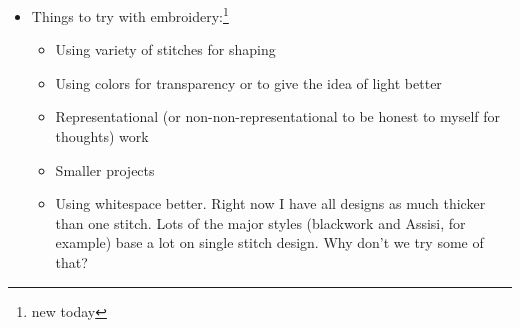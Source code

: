 \documentclass[12pt]{article}
\renewcommand{\,}{\textsuperscript{,}}
\begin{document}
\begin{itemize}
\begin{itemize}
\begin{itemize}
\begin{itemize}
Since every stitch is going to be marked out\footnote{or, at least, in general every stitch should be mostly mapped, though maybe not all for the weave and certainly not all for the background}, I'm thinking just go one color at a time?
Like for the knot layer, do all the red, then all the orange, and so on.
That'll look cool, to be certain!

Or, do I start with the background and work my way to solid color?
Eh, it'll end up depending how the swatches come out for multi-lines.
If it ends up that all I want is the single forward slash tent stitch, that'll make it much easier to do the background first.
Eh, that's questions for future.

\item Stitching: do.

I'll be curious what the rate that I can stitch ends up being. I'll have an idea of how many stitches large the project is, so then we can do time per stitch times n stitches is total time.
I'm guessing that it'll end up being about a stitch every ten seconds, especially once we account for threading the needle. 

Then again, I'm told that a needle threader exists, and that might save massive amounts of threading time.

I've mentioned it in the past, but I fight the two forces of:
\begin{enumerate}
\item Threading the needle takes a lot of time and so I want the longest possible thread to not have to do it as often. Plus, there's wasted thread from the ends I need to keep. Therefore, maximize working thread
\item Longer working thread takes longer to pull through, tangles and occasionally knots, and so I want a shorter working thread.
\end{enumerate}
Thread is honestly cheap enough that losing bits for the stabler stitches or the ends of shorter working lengths shouldn't really be a bother to me. That being said, we'll see how good a threader is before I make any other decisions.
I'll have to ask my friends how to use one as well, since the directions seem spooky.

\end{itemize}

\item Things to try with embroidery:\footnote{new today}
\begin{itemize}
\item Using variety of stitches for shaping
\item Using colors for transparency or to give the idea of light better
\item Representational (or non-non-representational to be honest to myself for thoughts) work
\item Smaller projects
\item Using whitespace better. Right now I have all designs as much thicker than one stitch.
Lots of the major styles (blackwork and Assisi, for example) base a lot on single stitch design. Why don't we try some of that?
\end{itemize}


\end{itemize}
\end{itemize}
\end{itemize}
\end{document}
